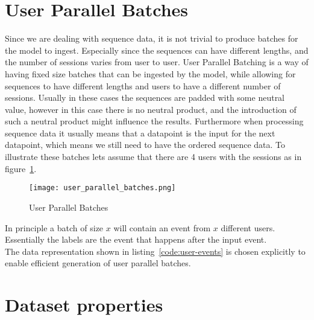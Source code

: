 \section{User Parallel Batches}
Since we are dealing with sequence data, it is not trivial to produce batches for the model to ingest.
Especially since the sequences can have different lengths, and the number of sessions varies from user to user.
User Parallel Batching is a way of having fixed size batches that can be ingested by the model, while allowing for sequences to have different lengths and users to have a different number of sessions.
Usually in these cases the sequences are padded with some neutral value, however in this case there is no neutral product, and the introduction of such a neutral product might influence the results.
Furthermore when processing sequence data it usually means that a datapoint is the input for the next datapoint, which means we still need to have the ordered sequence data.
To illustrate these batches lets assume that there are 4 users with the sessions as in figure~\ref{fig:user_parallel_batches}.

\begin{figure}[ht]
	\centering
	\captionsetup{width=0.8\textwidth}
    \texttt{[image: user\_parallel\_batches.png]}
    \caption{User Parallel Batches}
    \label{fig:user_parallel_batches}
\end{figure}

In principle a batch of size $x$ will contain an event from $x$ different users.
Essentially the labels are the event that happens after the input event.
\\
The data representation shown in listing~\ref{code:user-events} is chosen explicitly to enable efficient generation of user parallel batches.

\section{Dataset properties}\label{sec:dataset_properties}

